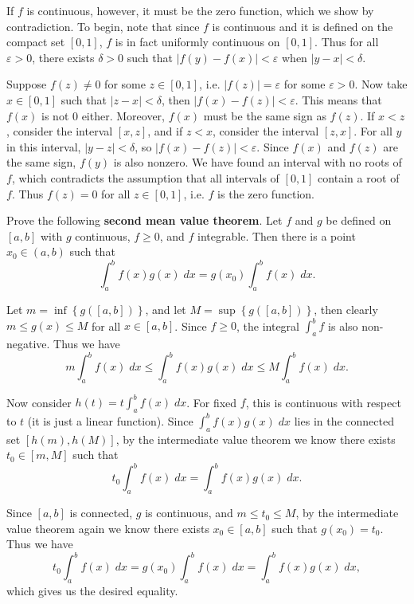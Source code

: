 \documentclass[10pt]{amsart}
\newenvironment{exercise}[1]{%
        \vspace{10mm}
        \renewcommand\themanualtheoreminner{#1}%
  \manualtheoreminner
}\hrulefill{\endmanualtheoreminner}
\begin{document}
If $f$ is continuous, however, it must be the zero function, which we show by contradiction. To begin, note that since $f$ is continuous and it is defined on the compact set $[0,1]$, $f$ is in fact uniformly continuous on $[0,1]$. Thus for all $\varepsilon>0$, there exists $\delta>0$ such that $|f(y)-f(x)| < \varepsilon$ when $|y-x| < \delta$.

Suppose $f(z) \neq 0$ for some $z \in [0,1]$, i.e. $|f(z)| = \varepsilon$ for some $\varepsilon>0$. Now take $x \in [0,1]$ such that $|z-x| < \delta$, then $|f(x)-f(z)| < \varepsilon$. This means that $f(x)$ is not 0 either. Moreover, $f(x)$ must be the same sign as $f(z)$. If $x<z$, consider the interval $[x,z]$, and if $z < x$, consider the interval $[z,x]$. For all $y$ in this interval, $|y-z| < \delta$, so $|f(x)-f(z)| < \varepsilon$. Since $f(x)$ and $f(z)$ are the same sign, $f(y)$ is also nonzero. We have found an interval with no roots of $f$, which contradicts the assumption that all intervals of $[0,1]$ contain a root of $f$. Thus $f(z)=0$ for all $z \in [0,1]$, i.e. $f$ is the zero function.

\begin{exercise}{Page 236, Exercise 4.45}
	Prove the following \textbf{second mean value theorem}. Let $f$ and $g$ be defined on $[a,b]$ with $g$ continuous, $f \geq 0$, and $f$ integrable. Then there is a point $x_0 \in (a,b)$ such that
	\[
		\int_{a}^{b} f(x) g(x) \;dx = g(x_0) \int_{a}^{b} f(x) \;dx.
	\] 
\end{exercise}

Let $m = \inf\left\{ g([a,b]) \right\}$, and let $M = \sup\left\{ g([a,b]) \right\}$, then clearly $m \leq g(x) \leq M$ for all $x \in [a,b]$. Since $f \geq 0$, the integral $\int_{a}^{b} f$ is also non-negative. Thus we have
\[
	m \int_{a}^{b} f(x) \;dx \leq \int_{a}^{b} f(x)g(x) \;dx \leq M \int_{a}^{b} f(x) \;dx.
\] 

Now consider $h(t) = t \int_{a}^{b} f(x) \;dx$. For fixed $f$, this is continuous with respect to $t$ (it is just a linear function). Since $\int_{a}^{b} f(x)g(x) \;dx$ lies in the connected set $[h(m), h(M)]$, by the intermediate value theorem we know there exists $t_0 \in [m,M]$ such that
\[
	t_0 \int_{a}^{b} f(x) \;dx = \int_{a}^{b} f(x) g(x) \;dx.
\]

Since $[a,b]$ is connected, $g$ is continuous, and $m \leq t_0 \leq M$, by the intermediate value theorem again we know there exists $x_0 \in [a,b]$ such that $g(x_0) = t_0$. Thus we have
\[
	t_0 \int_{a}^{b} f(x) \;dx = g(x_0) \int_{a}^{b} f(x) \;dx = \int_{a}^{b} f(x) g(x) \;dx,
\] which gives us the desired equality.
\end{document}
